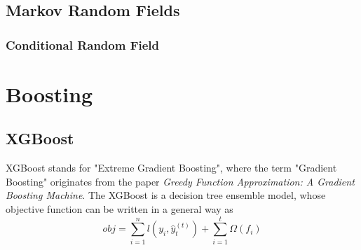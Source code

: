 \documentclass[a4paper, 12pt]{book} %
\begin{document}
\section{Markov Random Fields}
\subsection{Conditional Random Field}

\chapter{Boosting}
\section{XGBoost}
XGBoost stands for "Extreme Gradient Boosting", where the term "Gradient Boosting" originates from the paper \emph{Greedy Function Approximation: A Gradient Boosting Machine}. The XGBoost is a decision tree ensemble model, whose objective function can be written in a general way as 
$$obj=\sum_{i=1}^{n}{l(y_i,\hat{y}_{t}^{(t)})+\sum_{i=1}^{t}{\Omega{(f_i)}}}$$
\end{document}
